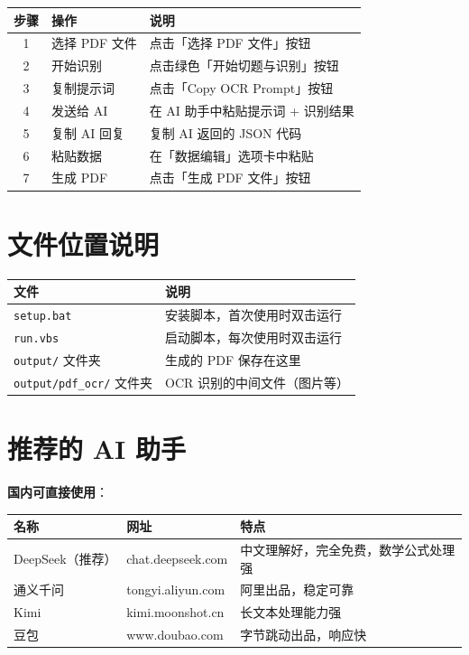 \documentclass[UTF8,zihao=-4,openany]{ctexbook}
\begin{document}
\begin{center}
	\begin{tabular}{|c|l|l|}
		\hline
		\textbf{步骤} & \textbf{操作} & \textbf{说明}           \\
		\hline
		1           & 选择 PDF 文件   & 点击「选择 PDF 文件」按钮       \\
		2           & 开始识别        & 点击绿色「开始切题与识别」按钮       \\
		3           & 复制提示词       & 点击「Copy OCR Prompt」按钮 \\
		4           & 发送给 AI      & 在 AI 助手中粘贴提示词 + 识别结果  \\
		5           & 复制 AI 回复    & 复制 AI 返回的 JSON 代码     \\
		6           & 粘贴数据        & 在「数据编辑」选项卡中粘贴         \\
		7           & 生成 PDF      & 点击「生成 PDF 文件」按钮       \\
		\hline
	\end{tabular}
\end{center}

\section{文件位置说明}

\begin{center}
	\begin{tabular}{lp{8cm}}
		\toprule
		\textbf{文件}                   & \textbf{说明}      \\
		\midrule
		\texttt{setup.bat}            & 安装脚本，首次使用时双击运行   \\
		\texttt{run.vbs}              & 启动脚本，每次使用时双击运行   \\
		\texttt{output/} 文件夹          & 生成的 PDF 保存在这里    \\
		\texttt{output/pdf\_ocr/} 文件夹 & OCR 识别的中间文件（图片等） \\
		\bottomrule
	\end{tabular}
\end{center}

\section{推荐的 AI 助手}

\textbf{国内可直接使用}：
\begin{center}
	\begin{tabular}{llp{5cm}}
		\toprule
		\textbf{名称}  & \textbf{网址}       & \textbf{特点}        \\
		\midrule
		DeepSeek（推荐） & chat.deepseek.com & 中文理解好，完全免费，数学公式处理强 \\
		通义千问         & tongyi.aliyun.com & 阿里出品，稳定可靠          \\
		Kimi         & kimi.moonshot.cn  & 长文本处理能力强           \\
		豆包           & www.doubao.com    & 字节跳动出品，响应快         \\
		\bottomrule
	\end{tabular}
\end{center}
\end{document}
